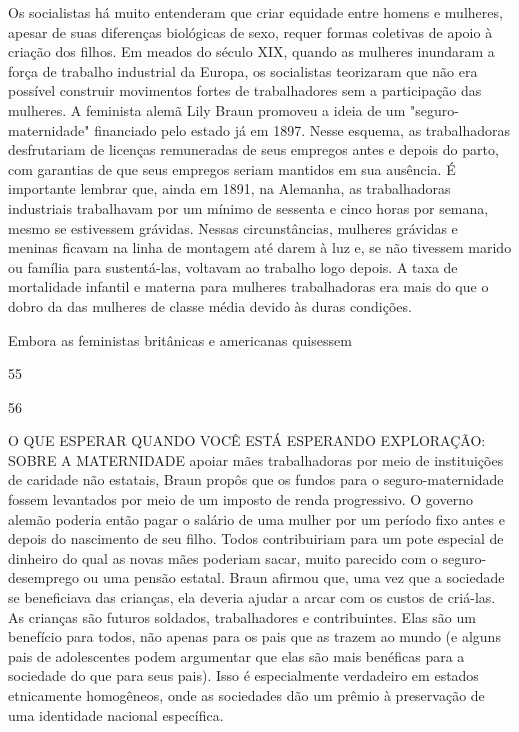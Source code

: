 Os socialistas há muito entenderam que criar equidade entre homens e mulheres, apesar de suas diferenças biológicas de sexo, requer formas coletivas de apoio à criação dos filhos. Em meados do século XIX, quando as mulheres inundaram a força de trabalho industrial da Europa, os socialistas teorizaram que não era possível construir movimentos fortes de trabalhadores sem a participação das mulheres. A feminista alemã Lily Braun promoveu a ideia de um "seguro-maternidade" financiado pelo estado já em 1897. Nesse esquema, as trabalhadoras desfrutariam de licenças remuneradas de seus empregos antes e depois do parto, com garantias de que seus empregos seriam mantidos em sua ausência. É importante lembrar que, ainda em 1891, na Alemanha, as trabalhadoras industriais trabalhavam por um mínimo de sessenta e cinco horas por semana, mesmo se estivessem grávidas. Nessas circunstâncias, mulheres grávidas e meninas ficavam na linha de montagem até darem à luz e, se não tivessem marido ou família para sustentá-las, voltavam ao trabalho logo depois. A taxa de mortalidade infantil e materna para mulheres trabalhadoras era mais do que o dobro da das mulheres de classe média devido às duras condições.
 \par 
Embora as feministas britânicas e americanas quisessem
 \par 
55
 \par 
56
 \par 
O QUE ESPERAR QUANDO VOCÊ ESTÁ ESPERANDO EXPLORAÇÃO: SOBRE A MATERNIDADE apoiar mães trabalhadoras por meio de instituições de caridade não estatais, Braun propôs que os fundos para o seguro-maternidade fossem levantados por meio de um imposto de renda progressivo. O governo alemão poderia então pagar o salário de uma mulher por um período fixo antes e depois do nascimento de seu filho. Todos contribuiriam para um pote especial de dinheiro do qual as novas mães poderiam sacar, muito parecido com o seguro-desemprego ou uma pensão estatal. Braun afirmou que, uma vez que a sociedade se beneficiava das crianças, ela deveria ajudar a arcar com os custos de criá-las. As crianças são futuros soldados, trabalhadores e contribuintes. Elas são um benefício para todos, não apenas para os pais que as trazem ao mundo (e alguns pais de adolescentes podem argumentar que elas são mais benéficas para a sociedade do que para seus pais). Isso é especialmente verdadeiro em estados etnicamente homogêneos, onde as sociedades dão um prêmio à preservação de uma identidade nacional específica.
 \par 
